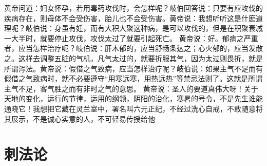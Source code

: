 \documentclass[a4paper,12pt,UTF8,twoside]{ctexbook}
\begin{document}
黄帝问道：妇女怀孕，若用毒药攻伐时，会怎样呢？岐伯回答说：只要有应攻伐的疾病存在，则母体不会受伤害，胎儿也不会受伤害。黄帝说：我想听听这是什麽道理呢？岐伯说：身虽有妊，而有大积大聚这种病，是可以攻伐的，但是在积聚衰减一大半时，就要停止攻伐，攻伐太过了就要引起死亡。
黄帝说：好。郁病之严重者，应当怎样治疗呢？岐伯说：肝木郁的，应当舒畅条达之；心火郁的，应当发散之。这样去调整五脏的气机，凡气太过的，就要折服其气，因为太过则畏折，就是所谓泻法。黄帝说：假借之气致病，应当怎样治疗呢？岐伯说：如果主气不足而有假借之气致病时，就不必要遵守“用寒远寒，用热远热”等禁忌法则了。这就是所谓主气不足，客气胜之而有非时之气的意思。
黄帝说：圣人的要道真伟大呀！关于天地的变化，运行的节律，运用的纲领，阴阳的治化，寒暑的号令，不是先生谁能通晓它！我想把它藏在灵兰室中，署名叫六元正纪，不经过洗心自戒，不敢随意将其展示，不是诚心实意的人，不可轻易传授给他

\chapter{刺法论}
\end{document}

